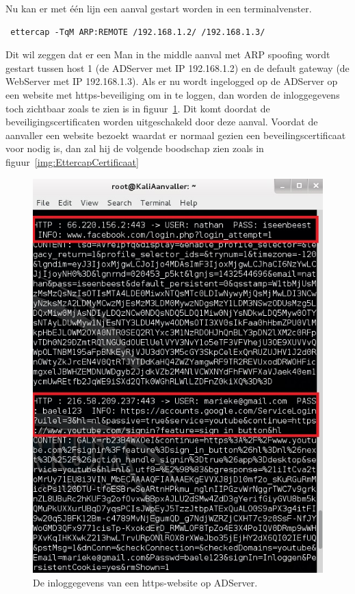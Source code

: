 \documentclass[pdftex,a4paper,12pt]{report}
\begin{document}
Nu kan er met één lijn een aanval gestart worden in een terminalvenster.
\begin{verbatim} ettercap -TqM ARP:REMOTE /192.168.1.2/ /192.168.1.3/ \end{verbatim}
Dit wil zeggen dat er een Man in the middle aanval met ARP spoofing wordt gestart tussen host 1 (de ADServer met IP 192.168.1.2) en de default gateway (de WebServer met IP 192.168.1.3). Als er nu wordt ingelogged op de ADServer op een website met https-beveiliging om in te loggen, dan worden de inloggegevens toch zichtbaar zoals te zien is in figuur~\ref{img:EttercapInlogHTTPS}. Dit komt doordat de beveiligingscertificaten worden uitgeschakeld door deze aanval. Voordat de aanvaller een website bezoekt waardat er normaal gezien een beveilingscertificaat voor nodig is, dan zal hij de volgende boodschap zien zoals in figuur~\ref{img:EttercapCertificaat} \citep{Canitank2009}

\begin{figure}[H]
\begin{center}
\includegraphics[scale=0.60]{img/EttercapInlogHTTPS}
\end{center}
\caption{De inloggegevens van een https-website op ADServer.}
\label{img:EttercapInlogHTTPS}
\end{figure}
\end{document}
